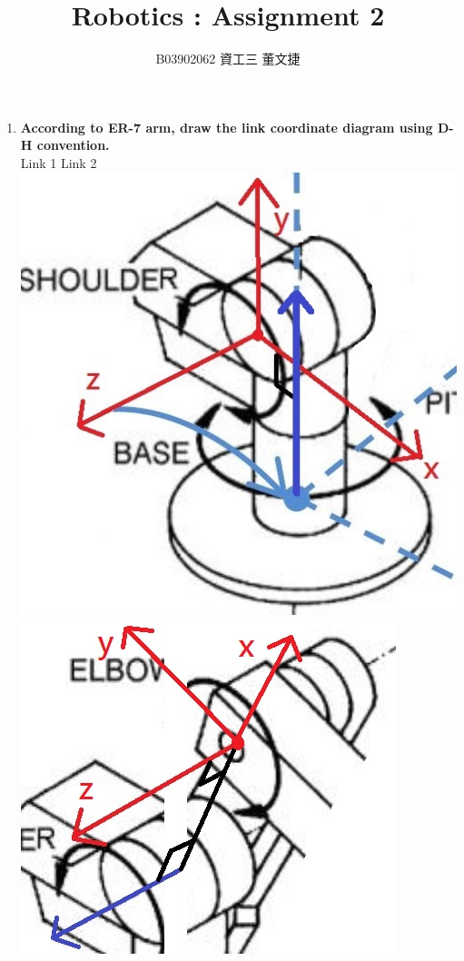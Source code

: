 \documentclass[12pt, a4paper]{article}
\date{}
\title{\vspace{-3.0cm} Robotics : Assignment 2 \\ \vspace{0.5cm}}
\author{\normalsize B03902062 資工三 \hspace{0cm} 董文捷}
\begin{document}
\maketitle

\begin{enumerate}[(1)]

\item
{\bf According to ER-7 arm, draw the link coordinate diagram using D-H convention.} \\
\newline
Link 1 \hspace{6cm} Link 2 \\
\includegraphics[scale = 0.5]{link1.JPG}
\hspace{1cm}
\includegraphics[scale = 0.5]{link2.JPG} \\

\end{enumerate}
\end{document}
